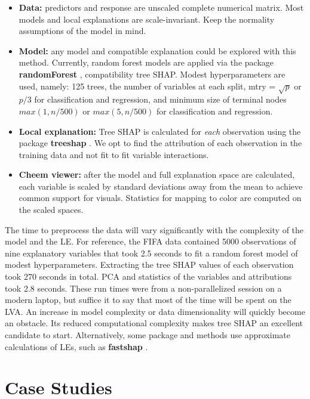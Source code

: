 \documentclass[
]{jss}
\providecommand{\tightlist}{%
  \setlength{\itemsep}{0pt}\setlength{\parskip}{0pt}}
\begin{document}
\begin{itemize}
\tightlist
\item
  \textbf{Data:} predictors and response are unscaled complete numerical
  matrix. Most models and local explanations are scale-invariant. Keep
  the normality assumptions of the model in mind.
\item
  \textbf{Model:} any model and compatible explanation could be explored
  with this method. Currently, random forest models are applied via the
  package \textbf{randomForest} \citep{liaw_classification_2002},
  compatibility tree SHAP. Modest hyperparameters are used, namely: 125
  trees, the number of variables at each split, mtry = \(\sqrt{p}\) or
  \(p/3\) for classification and regression, and minimum size of
  terminal nodes \(max(1, n/500)\) or \(max(5, n/500)\) for
  classification and regression.
\item
  \textbf{Local explanation:} Tree SHAP is calculated for \emph{each}
  observation using the package \textbf{treeshap}
  \citep{kominsarczyk_treeshap_2021}. We opt to find the attribution of
  each observation in the training data and not fit to fit variable
  interactions.
\item
  \textbf{Cheem viewer:} after the model and full explanation space are
  calculated, each variable is scaled by standard deviations away from
  the mean to achieve common support for visuals. Statistics for mapping
  to color are computed on the scaled spaces.
\end{itemize}

The time to preprocess the data will vary significantly with the
complexity of the model and the LE. For reference, the FIFA data
contained 5000 observations of nine explanatory variables that took 2.5
seconds to fit a random forest model of modest hyperparameters.
Extracting the tree SHAP values of each observation took 270 seconds in
total. PCA and statistics of the variables and attributions took 2.8
seconds. These run times were from a non-parallelized session on a
modern laptop, but suffice it to say that most of the time will be spent
on the LVA. An increase in model complexity or data dimensionality will
quickly become an obstacle. Its reduced computational complexity makes
tree SHAP an excellent candidate to start. Alternatively, some package
and methods use approximate calculations of LEs, such as
\textbf{fastshap} \citet{greenwell_fastshap_2020}.

\hypertarget{sec:casestudies}{%
\section{Case Studies}\label{sec:casestudies}}
\end{document}
